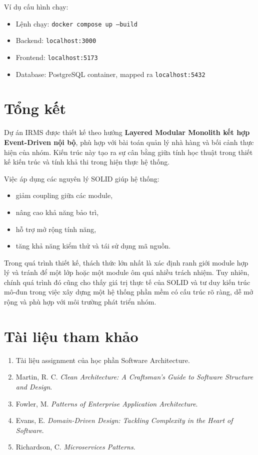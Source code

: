 \documentclass[12pt,a4paper]{article}
\begin{document}
Ví dụ cấu hình chạy:
\begin{itemize}
    \item Lệnh chạy: \texttt{docker compose up --build}
    \item Backend: \texttt{localhost:3000}
    \item Frontend: \texttt{localhost:5173}
    \item Database: PostgreSQL container, mapped ra \texttt{localhost:5432}
\end{itemize}

\section{Tổng kết}

Dự án IRMS được thiết kế theo hướng \textbf{Layered Modular Monolith kết hợp Event-Driven nội bộ}, phù hợp với bài toán quản lý nhà hàng và bối cảnh thực hiện của nhóm. Kiến trúc này tạo ra sự cân bằng giữa tính học thuật trong thiết kế kiến trúc và tính khả thi trong hiện thực hệ thống.

Việc áp dụng các nguyên lý SOLID giúp hệ thống:
\begin{itemize}
    \item giảm coupling giữa các module,
    \item nâng cao khả năng bảo trì,
    \item hỗ trợ mở rộng tính năng,
    \item tăng khả năng kiểm thử và tái sử dụng mã nguồn.
\end{itemize}

Trong quá trình thiết kế, thách thức lớn nhất là xác định ranh giới module hợp lý và tránh để một lớp hoặc một module ôm quá nhiều trách nhiệm. Tuy nhiên, chính quá trình đó cũng cho thấy giá trị thực tế của SOLID và tư duy kiến trúc mô-đun trong việc xây dựng một hệ thống phần mềm có cấu trúc rõ ràng, dễ mở rộng và phù hợp với môi trường phát triển nhóm.

\section{Tài liệu tham khảo}

\begin{enumerate}
    \item Tài liệu assignment của học phần Software Architecture.
    \item Martin, R. C. \textit{Clean Architecture: A Craftsman's Guide to Software Structure and Design}.
    \item Fowler, M. \textit{Patterns of Enterprise Application Architecture}.
    \item Evans, E. \textit{Domain-Driven Design: Tackling Complexity in the Heart of Software}.
    \item Richardson, C. \textit{Microservices Patterns}.
\end{enumerate}
\end{document}
